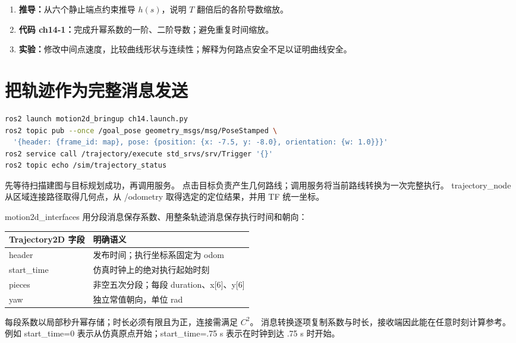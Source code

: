 \begin{enumerate}
\item \textbf{推导：}从六个静止端点约束推导 $h(s)$，说明 $T$ 翻倍后的各阶导数缩放。
\item \textbf{代码 ch14-1：}完成升幂系数的一阶、二阶导数；避免重复时间缩放。
\item \textbf{实验：}修改中间点速度，比较曲线形状与连续性；解释为何路点安全不足以证明曲线安全。
\end{enumerate}
\section{把轨迹作为完整消息发送}
\begin{lstlisting}[language=bash]
ros2 launch motion2d_bringup ch14.launch.py
ros2 topic pub --once /goal_pose geometry_msgs/msg/PoseStamped \
  '{header: {frame_id: map}, pose: {position: {x: -7.5, y: -8.0}, orientation: {w: 1.0}}}'
ros2 service call /trajectory/execute std_srvs/srv/Trigger '{}'
ros2 topic echo /sim/trajectory_status
\end{lstlisting}
先等待扫描建图与目标规划成功，再调用服务。
点击目标负责产生几何路线；调用服务将当前路线转换为一次完整执行。
trajectory\_node 从区域连接路径取得几何点，从 /odometry 取得选定的定位结果，并用 TF 统一坐标。

motion2d\_interfaces 用分段消息保存系数、用整条轨迹消息保存执行时间和朝向：
\begin{center}\small
\begin{tabular}{ll}\toprule
Trajectory2D 字段 & 明确语义 \\\midrule
header & 发布时间；执行坐标系固定为 odom \\
start\_time & 仿真时钟上的绝对执行起始时刻 \\
pieces & 非空五次分段；每段 duration、x[6]、y[6] \\
yaw & 独立常值朝向，单位 rad \\\bottomrule
\end{tabular}
\end{center}
每段系数以局部秒升幂存储；时长必须有限且为正，连接需满足 $C^2$。
消息转换逐项复制系数与时长，接收端因此能在任意时刻计算参考。
例如 start\_time=0 表示从仿真原点开始；start\_time=.75 s 表示在时钟到达 .75 s 时开始。

